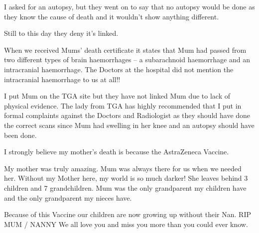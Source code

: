 {I asked for an autopsy, but they went on to say that no autopsy would be done as
they know the cause of death and it wouldn’t show anything different.

Still to this day they deny it’s linked.

When we received Mums’ death certificate it states that Mum had passed from two
different types of brain haemorrhages – a subarachnoid haemorrhage and an
intracranial haemorrhage. The Doctors at the hospital did not mention the
intracranial haemorrhage to us at all!!

I put Mum on the TGA site but they have not linked Mum due to lack of physical
evidence. The lady from TGA has highly recommended that I put in formal
complaints against the Doctors and Radiologist as they should have done the
correct scans since Mum had swelling in her knee and an autopsy should have been
done.

I strongly believe my mother’s death is because the AstraZeneca Vaccine.

My mother was truly amazing. Mum was always there for us when we needed
her. Without my Mother here, my world is so much darker! She leaves behind 3
children and 7 grandchildren. Mum was the only grandparent my children have and
the only grandparent my nieces have.

Because of this Vaccine our children are now growing up without their Nan. RIP
MUM / NANNY We all love you and miss you more than you could ever know.

}
